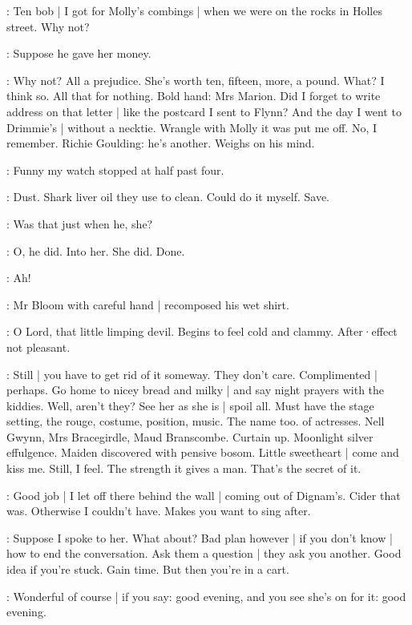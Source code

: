 \BloomHist:
Ten bob |
I got for Molly's combings |
when we were on the rocks
in Holles street.
Why not?

\BloomToday:
Suppose he gave her money.

\BloomHist:
Why not?
All a prejudice.
She's worth ten,
fifteen,
more,
a pound.
What?
I think so.
All that for nothing.
Bold hand:
Mrs Marion.
Did I forget
to write address on that letter |
like the postcard I sent to Flynn?
And the day I went to Drimmie's |
without a necktie.
Wrangle with Molly
it was put me off.
No,
I remember.
Richie Goulding:
he's another.
Weighs on his mind.

\BloomToday:
Funny my watch stopped at half past four.

\BloomAbstract:
Dust.
Shark liver oil
they use to clean.
Could do it myself.
Save.

\BloomToday:
Was that just when he,
she?

\BloomToday:
O,
he did.
Into her.
She did.
Done.

\BloomInt:
Ah!%

:
Mr Bloom with careful hand |
recomposed his wet shirt.

\BloomCurrent:
O Lord,
that little limping devil.
Begins to feel cold and clammy.
After·effect not pleasant.

\BloomAbstract:
Still |
you have to get rid of it someway.
They don't care.
Complimented |
perhaps.
Go home to nicey bread and milky |
and say night prayers with the kiddies.
Well,
aren't they?
See her as she is |
spoil all.
Must have the stage setting,
the rouge,
costume,
position,
music.
The name too.
 of actresses.
Nell Gwynn,
Mrs Bracegirdle,
Maud Branscombe.
Curtain up.
Moonlight silver effulgence.
Maiden discovered with pensive bosom.
Little sweetheart |
come and kiss me.
Still,
I feel.
The strength it gives a man.
That's the secret of it.%

\BloomToday:
Good job |
I let off there behind the wall |
coming out of Dignam's.
Cider that was.
Otherwise I couldn't have.
Makes you want to sing after.

\BloomCurrent:
Suppose I spoke to her.
What about?
Bad plan however |
if you don't know |
how to end the conversation.
Ask them a question |
they ask you another.
Good idea
if you're stuck.
Gain time.
But then you're in a cart.

\BloomAbstract:
Wonderful of course |
if you say:
good evening,
and you see she's on for it:
good evening.

